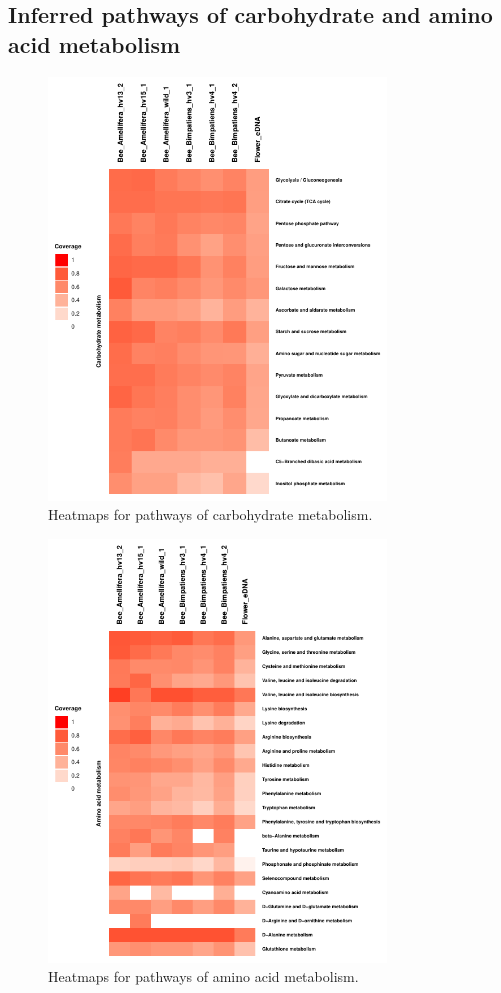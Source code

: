 \documentclass[11pt]{article}
\begin{document}
  \subsection{Inferred pathways of carbohydrate and amino acid metabolism}
  \begin{figure}[H]
    \centering
    \includegraphics[width=0.8\textwidth]{../Figures/PathwayCov_Carbonhydrate.pdf}
    \caption{Heatmaps for pathways of carbohydrate metabolism.}
    \label{Carbohydrate}
    \end{figure}

    \begin{figure}[H]
      \centering
      \includegraphics[width=0.8\textwidth]{../Figures/PathwayCov_AminoAcid.pdf}
      \caption{Heatmaps for pathways of amino acid metabolism.}
      \label{AminoAcid}
      \end{figure}

  \newpage
  
  
\end{document}
